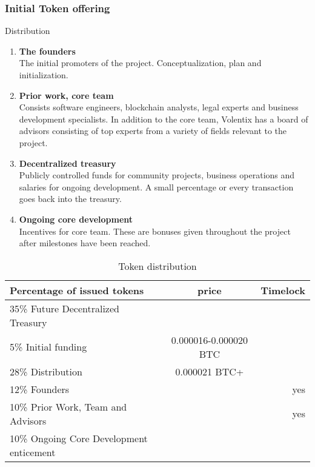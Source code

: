 \documentclass[]{article}
\begin{document}
{ 
\subsubsection{Initial Token offering}
 
Distribution
\begin{enumerate}
\item \textbf{The founders}\\
The initial promoters of the project. 
Conceptualization, plan and initialization.	
\item \textbf{Prior work,	 core team }\\
Consists software engineers, blockchain analysts, legal experts and business development specialists. 
In addition to the core team, Volentix has a board of advisors consisting of top experts from a variety of fields relevant to the project.
\item\textbf{ Decentralized treasury}\\
Publicly controlled funds for community projects, business operations and salaries for ongoing development. 
A small percentage or every transaction goes back into the treasury.
\item \textbf{Ongoing core development} \\
Incentives for core team. These are bonuses given throughout the project after milestones have been reached.
\end{enumerate}
	
\begin{table}[h!]
	\begin{center}
		\caption{Token distribution}
		\label{tab:table1}
		\begin{tabular}{l|c|r}
			\textbf{Percentage of issued tokens} & \textbf{price} & \textbf{Timelock} \\
		
			\hline
			35\% Future Decentralized Treasury & & \\
			\hline
			5\%  Initial funding & 0.000016-0.000020 BTC & \\
			\hline
			28\% Distribution & 0.000021 BTC+ & \\
			\hline
			12\% Founders &  & yes \\
			\hline
			10\% Prior Work, Team and Advisors & & yes\\
		
			\hline
			10\% Ongoing Core Development enticement & &\\
			\hline		
			
				
		\end{tabular}
	\end{center}



\end{table}}
\end{document}
